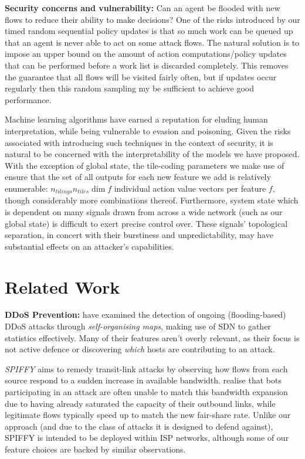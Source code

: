 \documentclass[conference, letterpaper, 10pt, times]{IEEEtran}
\newcommand{\fakepara}[1]{\noindent\textbf{#1:}}
\begin{document}
\fakepara{Security concerns and vulnerability}
Can an agent be flooded with new flows to reduce their ability to make decisions?
One of the risks introduced by our timed random sequential policy updates is that so much work can be queued up that an agent is never able to act on some attack flows.
The natural solution is to impose an upper bound on the amount of action computations/policy updates that can be performed before a work list is discarded completely.
This removes the guarantee that all flows will be visited fairly often, but if updates occur regularly then this random sampling my be sufficient to achieve good performance.

Machine learning algorithms have earned a reputation for eluding human interpretation, while being vulnerable to evasion and poisoning.
Given the risks associated with introducing such techniques in the context of security, it is natural to be concerned with the interpretability of the models we have proposed.
With the exception of global state, the tile-coding parameters we make use of ensure that the set of all outputs for each new feature we add is relatively enumerable: $n_{\mathit{tilings}}n_{\mathit{tiles}}\dim{f}$ individual action value vectors per feature $f$, though considerably more combinations thereof.
Furthermore, system state which is dependent on many signals drawn from across a wide network (such as our global state) is difficult to exert precise control over.
These signals' topological separation, in concert with their burstiness and unpredictability, may have substantial effects on an attacker's capabilities.

\section{Related Work}


\fakepara{DDoS Prevention}
\Textcite{DBLP:conf/lcn/BragaMP10} have examined the detection of ongoing (flooding-based) DDoS attacks through \emph{self-organising maps}, making use of SDN to gather statistics effectively.
Many of their features aren't overly relevant, as their focus is not active defence or discovering \emph{which} hosts are contributing to an attack.

\emph{SPIFFY} \cite{DBLP:conf/ndss/KangGS16} aims to remedy transit-link attacks by observing how flows from each source respond to a sudden increase in available bandwidth.
 realise that bots participating in an attack are often unable to match this bandwidth expansion due to having already saturated the capacity of their outbound links, while legitimate flows typically speed up to match the new fair-share rate.
Unlike our approach (and due to the class of attacks it is designed to defend against), SPIFFY is intended to be deployed within ISP networks, although some of our feature choices are backed by similar observations.
\end{document}
